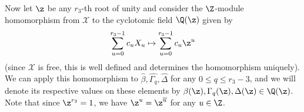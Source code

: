 Now let $\z$ be any $r_3$-th root of unity and consider the $\Z$-module homomorphism from $\mathcal{X}$ to the cyclotomic field $\Q(\z)$ given by $$\sum_{u=0}^{r_3-1}c_u X_u\mapsto \sum_{u=0}^{r_3-1}c_u \z^u$$ 
(since $\mathcal{X}$ is free, this is well defined and determines the homomorphism uniquely).
We can apply this homomorphism to $\widehat{\beta},\widehat{\Gamma_q},\widehat{\Delta}$ for any $0\le q \le r_3-3$, and we will denote its respective values on these elements by $\beta(\z),\Gamma_q(\z),\Delta(\z)\in\Q(\z)$. Note that since $\z^{r_3}=1$, we have $\z^u=\z^{\overline{u}}$ for any $u\in\Z$.

